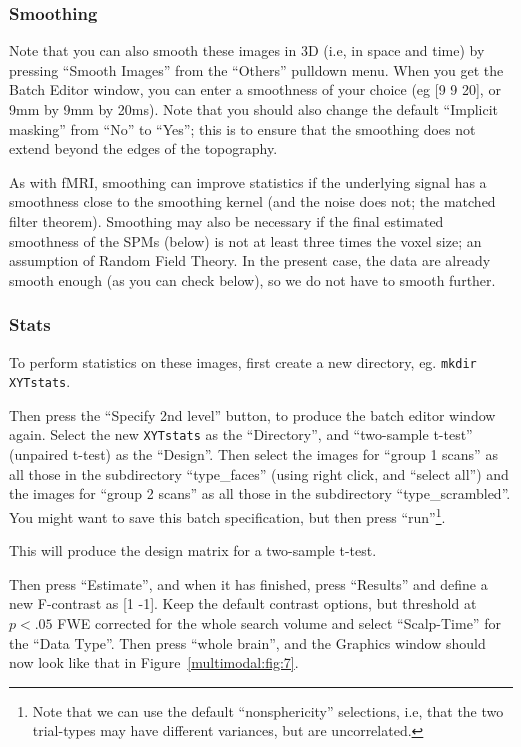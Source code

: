 \subsubsection{Smoothing \label{multimodal:eeg:3Dsmooth}}

Note that you can also smooth these images in 3D (i.e, in space and time) by pressing ``Smooth Images'' from the ``Others'' pulldown menu. When you get the Batch Editor window, you can enter a smoothness of your choice (eg [9 9 20], or 9mm by 9mm by 20ms). Note that you should also change the default ``Implicit masking'' from ``No'' to ``Yes''; this is to ensure that the smoothing does not extend beyond the edges of the topography.

As with fMRI, smoothing can improve statistics if the underlying signal has a smoothness close to the smoothing kernel (and the noise does not; the matched filter theorem). Smoothing may also be necessary if the final estimated smoothness of the SPMs (below) is not at least three times the voxel size; an assumption of Random Field Theory. In the present case, the data are already smooth enough (as you can check below), so we do not have to smooth further.


\subsubsection{Stats \label{multimodal:eeg:3Dstats}}

To perform statistics on these images, first create a new directory, eg. \texttt{mkdir XYTstats}.

Then press the ``Specify 2nd level'' button, to produce the batch editor window again. Select the new \texttt{XYTstats} as the ``Directory'', and ``two-sample t-test'' (unpaired t-test) as the ``Design''. Then select the images for ``group 1 scans'' as all those in the subdirectory ``type\_faces'' (using right click, and ``select all'') and the images for ``group 2 scans'' as all those in the subdirectory ``type\_scrambled''. You might want to save this batch specification, but then press ``run''\footnote{Note that we can use the default ``nonsphericity'' selections, i.e, that the two trial-types may have different variances, but are uncorrelated.}.

This will produce the design matrix for a two-sample t-test.

Then press ``Estimate'', and when it has finished, press ``Results'' and define a new F-contrast as [1 -1]. Keep the default contrast options, but threshold at $p<.05$ FWE corrected for the whole search volume and select ``Scalp-Time'' for the ``Data Type''. Then press ``whole brain'', and the Graphics window should now look like that in Figure~\ref{multimodal:fig:7}.

